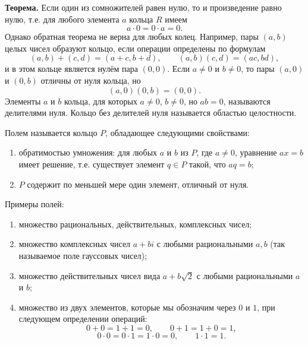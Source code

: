 \begin{rusblock}
\textbf{Теорема.} Если один из сомножителей равен нулю, то и произведение равно нулю, т.е. для любого элемента $a$ кольца $R$ имеем
\[
a\cdot0=0\cdot a=0.
\]
Однако обратная теорема не верна для любых колец. Например, пары $(a,b)$ целых чисел образуют кольцо, если операции определены по формулам
\[
(a,b)+(c,d)=(a+c,b+d),\qquad (a,b)(c,d)=(ac,bd),
\]
и в этом кольце является нулём пара $(0,0)$. Если $a\ne0$ и $b\ne0$, то пары $(a,0)$ и $(0,b)$ отличны от нуля кольца, но
\[
(a,0)(0,b)=(0,0).
\]
Элементы $a$ и $b$ кольца, для которых $a\ne0$, $b\ne0$, но $ab=0$, называются делителями нуля. Кольцо без делителей нуля называется областью целостности.
\end{rusblock}

\begin{rusblock}
Полем называется кольцо $P$, обладающее следующими свойствами:
\begin{enumerate}[leftmargin=2.2em]
\item обратимостью умножения: для любых $a$ и $b$ из $P$, где $a\ne0$, уравнение $ax=b$ имеет решение, т.е. существует элемент $q\in P$ такой, что $aq=b$;
\item $P$ содержит по меньшей мере один элемент, отличный от нуля.
\end{enumerate}
Примеры полей:
\begin{enumerate}[leftmargin=2.2em]
\item множество рациональных, действительных, комплексных чисел;
\item множество комплексных чисел $a+bi$ с любыми рациональными $a,b$ (так называемое поле гауссовых чисел);
\item множество действительных чисел вида $a+b\sqrt2$ с любыми рациональными $a$ и $b$;
\item множество из двух элементов, которые мы обозначим через $0$ и $1$, при следующем определении операций:
\[
0+0=1+1=0,\qquad 0+1=1+0=1,
\]
\[
0\cdot0=0\cdot1=1\cdot0=0,\qquad 1\cdot1=1.
\]
\end{enumerate}
\end{rusblock}

